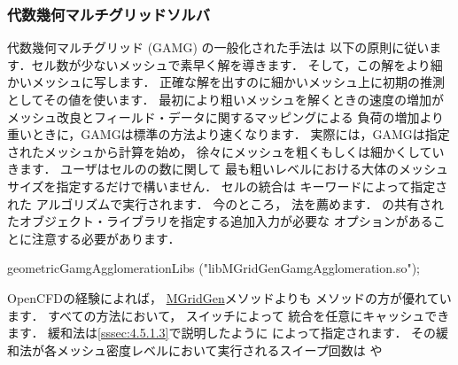 \subsubsection{代数幾何マルチグリッドソルバ}
\label{sssec:4.5.1.4}
%
%
代数幾何マルチグリッド (GAMG) の一般化された手法は
以下の原則に従います．セル数が少ないメッシュで素早く解を導きます．
そして，この解をより細かいメッシュに写します．
正確な解を出すのに細かいメッシュ上に初期の推測としてその値を使います．
最初により粗いメッシュを解くときの速度の増加が
メッシュ改良とフィールド・データに関するマッピングによる
負荷の増加より重いときに，GAMGは標準の方法より速くなります．
実際には，GAMGは指定されたメッシュから計算を始め，
徐々にメッシュを粗くもしくは細かくしていきます．
ユーザはセルのの数に関して
最も粗いレベルにおける大体のメッシュサイズを指定するだけで構いません．
セルの統合は
%
%
キーワードによって指定された
アルゴリズムで実行されます．
今のところ，
%
%
法を薦めます．
の共有されたオブジェクト・ライブラリを指定する追加入力が必要な
%
%
オプションがあることに注意する必要があります．
\begin{OFverbatim}[file]
geometricGamgAgglomerationLibs ("libMGridGenGamgAgglomeration.so");
\end{OFverbatim}
OpenCFDの経験によれば，
\href{http://www-users.cs.umn.edu/~moulitsa/software.html}{MGridGen}メソッドよりも
メソッドの方が優れています．
すべての方法において，
%
%
スイッチによって
統合を任意にキャッシュできます．
緩和法は\autoref{sssec:4.5.1.3}で説明したように
%
%
によって指定されます．
その緩和法が各メッシュ密度レベルにおいて実行されるスイープ回数は
%
%
や
